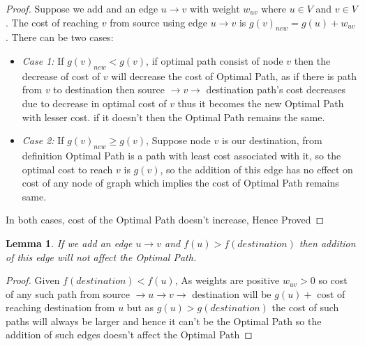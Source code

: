 \documentclass[a4paper]{article}
\newtheorem{lemma}[theorem]{Lemma}
\begin{document}
\begin{proof}
 Suppose we add and an edge $u \rightarrow v $ with weight $w_{uv}$ where $u \in V$ and $v \in V$. The cost of reaching $v$ from source using edge $u \rightarrow v$ is $g(v)_{new} = g(u) + w_{uv}$. There can be two cases:
\begin{itemize}[label={}]
    \item \textit{Case 1:} If $g(v)_{new} < g(v)$, if optimal path consist of node $v$ then the decrease of cost of $v$ will decrease the cost of Optimal Path, as if there is path from $v$ to destination then source $\rightarrow v \rightarrow$ destination path's cost decreases due to decrease in optimal cost of $v$ thus it becomes the new Optimal Path with lesser cost. if it doesn't then the Optimal Path remains the same.
    
    \item \textit{Case 2:} If $g(v)_{new} \geq g(v)$,  Suppose node $v$ is our destination, from definition Optimal Path is a path with least cost associated with it, so the optimal cost to reach $v$ is $g(v)$, so the addition of this edge has no effect on cost of any node of graph which implies the cost of Optimal Path remains same.
\end{itemize}
In both cases, cost of the Optimal Path doesn't increase, Hence Proved
\end{proof}

\begin{lemma}\label{lemma:insertion_property2}
If we add an edge $u \rightarrow v$ and $f(u) > f(destination)$ then addition of this edge will not affect the Optimal Path.
\end{lemma}
\begin{proof}
 Given  $f(destination) < f(u)$, As weights are positive $w_{uv} > 0$ so cost of any such path from source $\rightarrow u \rightarrow v \rightarrow$ destination will be $g(u) + $ cost of reaching destination from $u$ but as $g(u) > g(destination)$ the cost of such paths will always be larger and hence it can't be the Optimal Path so the addition of such edges doesn't affect the Optimal Path
\end{proof}
\end{document}
